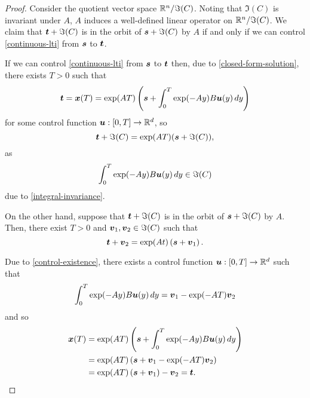 \begin{proof}
Consider the quotient vector space $\mathbb{R}^{n} / \Im(C)$. Noting that $\Im(C)$ is invariant under $A$, $A$ induces a well-defined linear operator on $\mathbb{R}^{n} / \Im(C)$. We claim that $\boldsymbol{t} + \Im(C)$ is in the orbit of $\boldsymbol{s} + \Im(C)$ by $A$ if and only if we can control \cref{continuous-lti} from $\boldsymbol{s}$ to $\boldsymbol{t}$.

If we can control \cref{continuous-lti} from $\boldsymbol{s}$ to $\boldsymbol{t}$ then, due to \cref{closed-form-solution}, there exists $T>0$ such that
\begin{equation*}
\boldsymbol{t} = \boldsymbol{x}(T) = \exp(A T) \left( \boldsymbol{s} + \int_{0}^{T} \exp(-Ay) B \boldsymbol{u}(y) \, dy \right)
\end{equation*}
for some control function $\boldsymbol{u} : [0,T] \rightarrow \mathbb{R}^{d}$, so
\begin{equation*}
\boldsymbol{t} + \Im(C) = \exp(A T) (\boldsymbol{s} + \Im(C)),
\end{equation*}
as
\begin{equation*}
\int_{0}^{T} \exp(-Ay) B \boldsymbol{u}(y) \, dy \in \Im(C)
\end{equation*}
due to \cref{integral-invariance}.

On the other hand, suppose that $\boldsymbol{t} + \Im(C)$ is in the orbit of $\boldsymbol{s} + \Im(C)$ by $A$. Then, there exist $T>0$ and $\boldsymbol{v}_{1}, \boldsymbol{v}_{2} \in \Im(C)$ such that
\begin{equation*}
\boldsymbol{t} + \boldsymbol{v}_{2} = \exp(At) \left( \boldsymbol{s} + \boldsymbol{v}_{1} \right).
\end{equation*}

Due to \cref{control-existence}, there exists a control function $\boldsymbol{u} : [0,T] \rightarrow \mathbb{R}^{d}$ such that
\begin{equation*}
\int_{0}^{T} \exp(-Ay) B \boldsymbol{u}(y) \, dy = \boldsymbol{v}_{1} - \exp(-A T) \boldsymbol{v}_{2}
\end{equation*}
and so
\begin{align*}
\boldsymbol{x}(T) &= \exp(A T) \left( \boldsymbol{s} + \int_{0}^{T} \exp(-Ay) B \boldsymbol{u}(y) \, dy \right) \\
&= \exp(A T) \left( \boldsymbol{s} + \boldsymbol{v}_{1} - \exp(-A T) \boldsymbol{v}_{2} \right) \\
&= \exp(A T) \left( \boldsymbol{s} + \boldsymbol{v}_{1} \right) - \boldsymbol{v}_{2} = \boldsymbol{t} .
\end{align*}

\end{proof}
